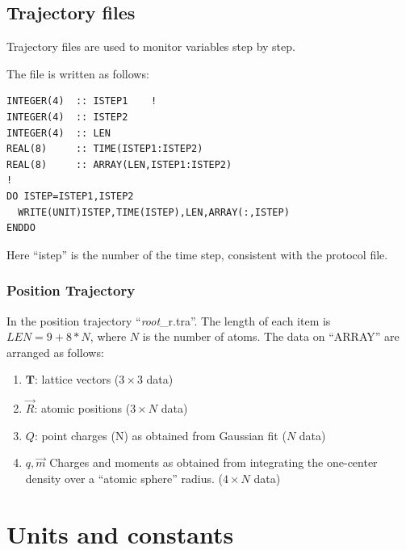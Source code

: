 \documentclass[final,12pt]{article}
\begin{document}
{{{%
\subsection{Trajectory files}
Trajectory files are used to monitor variables step by step. 

The file is written as follows:
\begin{verbatim}
INTEGER(4)  :: ISTEP1    !
INTEGER(4)  :: ISTEP2
INTEGER(4)  :: LEN
REAL(8)     :: TIME(ISTEP1:ISTEP2)
REAL(8)     :: ARRAY(LEN,ISTEP1:ISTEP2)
!
DO ISTEP=ISTEP1,ISTEP2
  WRITE(UNIT)ISTEP,TIME(ISTEP),LEN,ARRAY(:,ISTEP)
ENDDO
\end{verbatim}

Here ``istep'' is the number of the time step, consistent with the
protocol file. 

\subsubsection{Position Trajectory}
In the position trajectory ``{\it root}\_r.tra''. The length of each
item is $LEN=9+8*N$, where $N$ is the number of atoms. The data on
``ARRAY'' are arranged as follows:
\begin{enumerate}
\item $\mathbf{T}$: lattice vectors ($3\times3$ data)
\item $\vec{R}$: atomic positions ($3\times N$ data)
\item $Q$: point charges (N) as obtained from Gaussian fit ($N$ data)
\item $q,\vec{m}$ Charges and moments as obtained from integrating the
  one-center density over a ``atomic sphere'' radius. ($4\times N$ data)
\end{enumerate}





\newpage
\section{Units and constants}
\label{constants}

}}}
\end{document}
